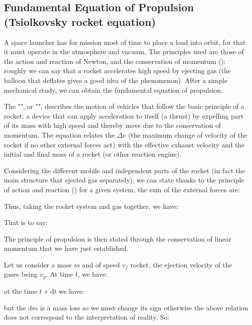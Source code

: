 	\subsection{Fundamental Equation of Propulsion (Tsiolkovsky rocket equation)}
	A space launcher has for mission most of time to place a load into orbit, for that it must operate in the atmosphere and vacuum. The principles used are those of the action and reaction of Newton, and the conservation of momentum (): roughly we can say that a rocket accelerates high speed by ejecting gas (the balloon that deflates gives a good idea of the phenomenon). After a simple mechanical study, we can obtain the fundamental equation of propulsion.
	
	The "", or "", describes the motion of vehicles that follow the basic principle of a rocket: a device that can apply acceleration to itself (a thrust) by expelling part of its mass with high speed and thereby move due to the conservation of momentum. The equation relates the $\Delta v$ (the maximum change of velocity of the rocket if no other external forces act) with the effective exhaust velocity and the initial and final mass of a rocket (or other reaction engine).
	
	Considering the different mobile and independent parts of the rocket (in fact the main structure that ejected gas separately), we can state thanks to the principle of action and reaction () for a given system, the sum of the external forces are:
	
	Thus, taking the rocket system and gas together, we have:
	
	That is to say:
	
	The principle of propulsion is then stated through the conservation of linear momentum that we have just established.
	
	Let us consider a mass $m$ and of speed $v_f$ rocket, the ejection velocity of the gases being $v_g$. At time $t$, we have:
	
	at the time $t+\mathrm{d}t$ we have:
	
	but the $\mathrm{d}m$ is a mass loss so we must change its sign otherwise the above relation does not correspond to the interpretation of reality. So:
	
